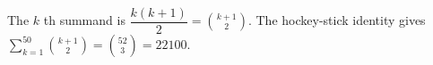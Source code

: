 The $ k $ th summand is $\dfrac{k(k+1)}{2}=\binom{k+1}{2}$. The hockey-stick identity gives $\sum_{k=1}^{50}\binom{k+1}{2}=\binom{52}{3}=\boxed{22100}$.
